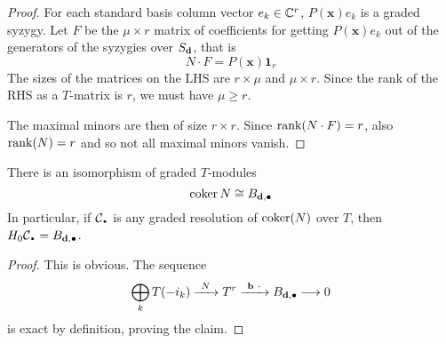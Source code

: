 \documentclass[fleqn,reqno]{amsart}
\begin{document}
\begin{proof}
For each standard basis column vector $e_k\in\mathbb{C}^r$, $P(\mathbf x)e_k$ is a graded syzygy.
Let $F$ be the $\mu\times r$ matrix of coefficients for getting $P(\mathbf x)e_k$
out of the generators of the syzygies over $S_\mathbf d$, that is
\[
	N\cdot F=P(\mathbf x)\mathbf 1_r
\]
The sizes of the matrices on the LHS are $r\times\mu$ and $\mu\times r$.
Since the rank of the RHS as a $T$-matrix is $r$, we must have $\mu\geq r$.

The maximal minors are then of size $r\times r$. Since $\operatorname{rank}(N\cdot F)=r$,
also $\operatorname{rank}(N)=r$ and so not all maximal minors vanish.
\end{proof}

\begin{lemma}
\label{lemma:cokerN}
There is an isomorphism of graded $T$-modules
\[
	\operatorname{coker} N\cong B_{\mathbf d,\bullet}
\]
In particular, if $\mathcal{C}_\nbul$ is any graded resolution of $\operatorname{coker}(N)$ over $T$,
then $H_0\mathcal{C}_\nbul=B_{\d,\bullet}$.
\end{lemma}

\begin{proof}
This is obvious. The sequence
\begin{align}
	\label{eq:exact-seq-coker}
	\bigoplus_k T(-i_k)\xrightarrow{~N~}T^r\xrightarrow{~{\mathbf b}~\cdot~}B_{\mathbf d,\bullet}\longrightarrow 0
\end{align}
is exact by definition, proving the claim.
% 
%
%
%
\end{proof}
\end{document}

